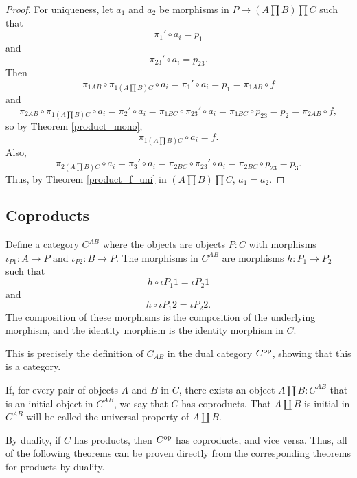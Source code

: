 \documentclass[../../math.tex]{subfiles}
\begin{document}
\begin{proof}
    For uniqueness, let $a_1$ and $a_2$ be morphisms in $P \to (A \prod B) \prod
    C$ such that
    \[
        \pi_1' \circ a_i = p_1
    \]
    and
    \[
        \pi_{23}' \circ a_i = p_{23}.
    \]
    Then
    \[
        \pi_{1AB} \circ \pi_{1 (A \prod B) C} \circ a_i
        = \pi_1' \circ a_i
        = p_1
        = \pi_{1AB} \circ f
    \]
    and
    \[
        \pi_{2AB} \circ \pi_{1 (A \prod B) C} \circ a_i
        = \pi_2' \circ a_i
        = \pi_{1BC} \circ \pi_{23}' \circ a_i
        = \pi_{1BC} \circ p_{23}
        = p_2
        = \pi_{2AB} \circ f,
    \]
    so by Theorem \ref{product_mono},
    \[
        \pi_{1 (A \prod B) C} \circ a_i = f.
    \]
    Also,
    \[
        \pi_{2 (A \prod B) C} \circ a_i
        = \pi_3' \circ a_i
        = \pi_{2BC} \circ \pi_{23}' \circ a_i
        = \pi_{2BC} \circ p_{23}
        = p_3.
    \]
    Thus, by Theorem \ref{product_f_uni} in $(A \prod B) \prod C$, $a_1 = a_2$.
\end{proof}

\subsection{Coproducts}

\begin{definition}
    Define a category $C^{AB}$ where the objects are objects $P : C$ with
    morphisms $\iota_{P1} : A \to P$ and $\iota_{P2} : B \to P$.  The morphisms
    in $C^{AB}$ are morphisms $h : P_1 \to P_2$ such that
    \[
        h \circ \iota{P_1 1} = \iota{P_2 1}
    \]
    and
    \[
        h \circ \iota{P_1 2} = \iota{P_2 2}.
    \]
    The composition of these morphisms is the composition of the underlying
    morphism, and the identity morphism is the identity morphism in $C$.
\end{definition}

This is precisely the definition of $C_{AB}$ in the dual category $C^{\mathrm{op}}$,
showing that this is a category.

\begin{class}
    If, for every pair of objects $A$ and $B$ in $C$, there exists an object $A
    \amalg B : C^{AB}$ that is an initial object in $C^{AB}$, we say that $C$
    has coproducts.  That $A \amalg B$ is initial in $C^{AB}$ will be called the
    universal property of $A \amalg B$.
\end{class}

By duality, if $C$ has products, then $C^{\mathrm{op}}$ has coproducts, and vice versa.
Thus, all of the following theorems can be proven directly from the
corresponding theorems for products by duality.
\end{document}
